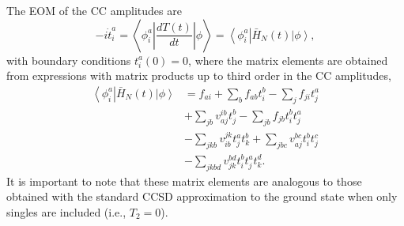 \documentclass[aps,prb,twocolumn,groupaddress,floatfix]{revtex4}
\begin{document}
The EOM of the CC amplitudes are
\begin{equation}
\label{eq:rt_eom_ccs}
-i \dot {t}_i^a = \left< \phi_{i}^{a} \left| \frac{d T(t)}{dt} \right| \phi \right>
= \left< \phi_{i}^{a} \right| \bar{H}_N(t) \left| \phi \right>,
\end{equation}
with boundary conditions $t_i^a(0)=0$,
where the matrix elements
are obtained from
expressions with matrix products up to third order in the CC amplitudes,
\begin{equation}
\label{eqn:matel2}
\begin{split}
\left< \phi_{i}^{a} \right| \bar{H}_N(t) \left| \phi \right> &=
 f_{ai} + \sum_b f_{ab} t_i^b - \sum_j f_{ji} t_j^a\\
& + \sum_{jb} v_{aj}^{ib} t_j^b - \sum_{jb} f_{jb} t_i^b t_j^a \\
&- \sum_{jkb} v_{ib}^{jk} t_j^a t_k^b + \sum_{jbc} v_{aj}^{bc} t_i^b t_j^c\\
&- \sum_{jkbd} v_{jk}^{bd} t_i^b t_j^a t_k^d.
\end{split}
\end{equation}
It is important to note that these matrix elements are analogous
to those obtained with the standard CCSD approximation to the ground state
when only singles are included (i.e., $T_2=0$).
\end{document}
